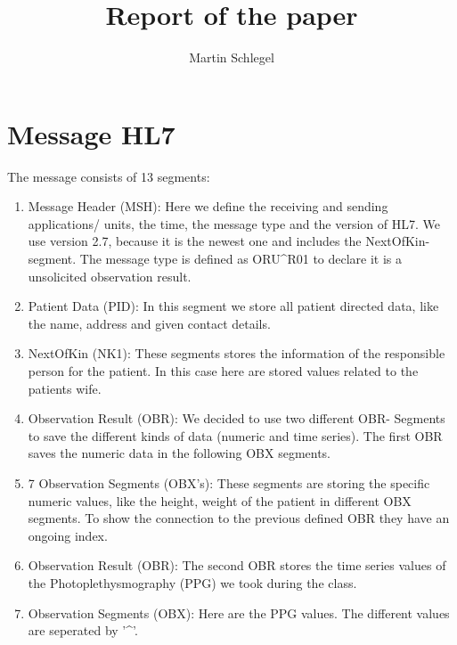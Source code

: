 \documentclass[11pt,a4paper,ngerman]{article}
\title{Report of the paper}
\author{Martin Schlegel}
\begin{document}
\maketitle

\section{Message HL7}
The message consists of 13 segments:
\begin{enumerate}
  \item Message Header (MSH): Here we define the receiving and sending applications/ units, the time, the message type and the version of HL7. We use version 2.7, because it is the newest one and includes the NextOfKin-segment. The message type is defined as ORU\textasciicircum R01 to declare it is a unsolicited observation result.
  \item Patient Data (PID): In this segment we store all patient directed data, like the name, address and given contact details.
  \item NextOfKin (NK1): These segments stores the information of the responsible person for the patient. In this case here are stored values related to the patients wife.
  \item Observation Result (OBR): We decided to use two different OBR- Segments to save the different kinds of data (numeric and time series). The first OBR saves the numeric data in the following OBX segments.
  \item 7 Observation Segments (OBX's): These segments are storing the specific numeric values, like the height, weight of the patient in different OBX segments. To show the connection to the previous defined OBR they have an ongoing index.
  \item Observation Result (OBR): The second OBR stores the time series values of the Photoplethysmography (PPG) we took during the class.
  \item Observation Segments (OBX): Here are the PPG values. The different values are seperated by '\textasciicircum'.
\end{enumerate}
\end{document}
